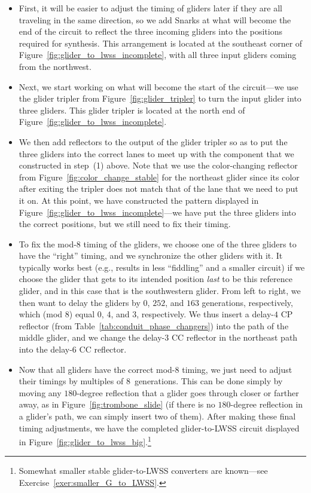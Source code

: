 \begin{itemize}
	\item[1)] First, it will be easier to adjust the timing of gliders later if they are all traveling in the same direction, so we add Snarks at what will become the end of the circuit to reflect the three incoming gliders into the positions required for synthesis. This arrangement is located at the southeast corner of Figure~\ref{fig:glider_to_lwss_incomplete}, with all three input gliders coming from the northwest.\smallskip
	
	\item[2)] Next, we start working on what will become the start of the circuit---we use the glider tripler from Figure~\ref{fig:glider_tripler} to turn the input glider into three gliders. This glider tripler is located at the north end of Figure~\ref{fig:glider_to_lwss_incomplete}.\smallskip
	
	\item[3)] We then add reflectors to the output of the glider tripler so as to put the three gliders into the correct lanes to meet up with the component that we constructed in step~(1) above. Note that we use the color-changing reflector from Figure~\ref{fig:color_change_stable} for the northeast glider since its color after exiting the tripler does not match that of the lane that we need to put it on. At this point, we have constructed the pattern displayed in Figure~\ref{fig:glider_to_lwss_incomplete}---we have put the three gliders into the correct positions, but we still need to fix their timing.\smallskip
	
	\item[4)] To fix the mod-$8$ timing of the gliders, we choose one of the three gliders to have the ``right'' timing, and we synchronize the other gliders with it. It typically works best (e.g., results in less ``fiddling'' and a smaller circuit) if we choose the glider that gets to its intended position \emph{last} to be this reference glider, and in this case that is the southwestern glider. From left to right, we then want to delay the gliders by $0$, $252$, and $163$ generations, respectively, which (mod $8$) equal $0$, $4$, and $3$, respectively. We thus insert a delay-$4$ CP reflector (from Table~\ref{tab:conduit_phase_changers}) into the path of the middle glider, and we change the delay-$3$ CC reflector in the northeast path into the delay-$6$ CC reflector.\smallskip
	
	\item[5)] Now that all gliders have the correct mod-$8$ timing, we just need to adjust their timings by multiples of $8$~generations. This can be done simply by moving any $180$-degree reflection that a glider goes through closer or farther away, as in Figure~\ref{fig:trombone_slide} (if there is no $180$-degree reflection in a glider's path, we can simply insert two of them). After making these final timing adjustments, we have the completed glider-to-LWSS circuit displayed in Figure~\ref{fig:glider_to_lwss_big}.\footnote{Somewhat smaller stable glider-to-LWSS converters are known---see Exercise~\ref{exer:smaller_G_to_LWSS}.}\medskip
\end{itemize}

